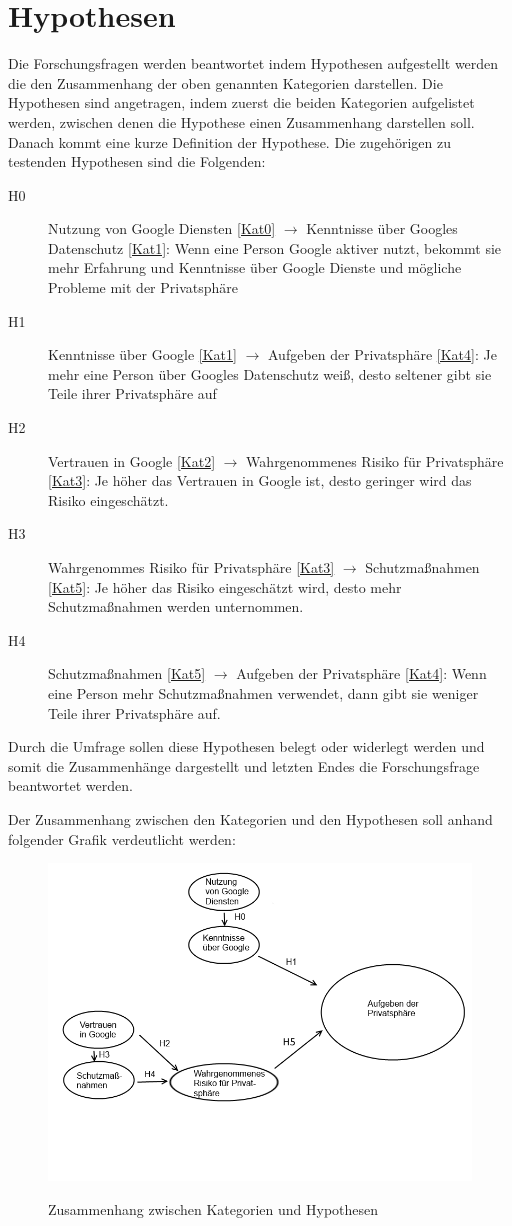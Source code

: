 \section{Hypothesen}
Die Forschungsfragen werden beantwortet indem Hypothesen aufgestellt werden die den Zusammenhang der oben genannten Kategorien darstellen.
Die Hypothesen sind angetragen, indem zuerst die beiden Kategorien aufgelistet werden, zwischen denen die Hypothese einen Zusammenhang darstellen soll. Danach kommt eine kurze Definition der Hypothese.
Die zugehörigen zu testenden Hypothesen sind die Folgenden:
\begin{description}
\item[H0] Nutzung von Google Diensten \ref{Kat0} $\rightarrow$ Kenntnisse über Googles Datenschutz \ref{Kat1}: Wenn eine Person Google aktiver nutzt, bekommt sie mehr Erfahrung und Kenntnisse über Google Dienste und mögliche Probleme mit der Privatsphäre
\item[H1] Kenntnisse über Google \ref{Kat1} $\rightarrow$ Aufgeben der Privatsphäre \ref{Kat4}: Je mehr eine Person über Googles Datenschutz weiß, desto seltener gibt sie Teile ihrer Privatsphäre auf
\item[H2] Vertrauen in Google \ref{Kat2} $\rightarrow$ Wahrgenommenes Risiko für Privatsphäre \ref{Kat3}: Je höher das Vertrauen in Google ist, desto geringer wird das Risiko eingeschätzt.
\item[H3] Wahrgenommes Risiko für Privatsphäre \ref{Kat3} $\rightarrow$ Schutzmaßnahmen \ref{Kat5}: Je höher das Risiko eingeschätzt wird, desto mehr Schutzmaßnahmen werden unternommen.
\item[H4] Schutzmaßnahmen \ref{Kat5} $\rightarrow$ Aufgeben der Privatsphäre \ref{Kat4}: Wenn eine Person mehr Schutzmaßnahmen verwendet, dann gibt sie weniger Teile ihrer Privatsphäre auf.
\end{description}
Durch die Umfrage sollen diese Hypothesen belegt oder widerlegt werden und somit die Zusammenhänge dargestellt und letzten Endes die Forschungsfrage beantwortet werden.

Der Zusammenhang zwischen den Kategorien und den Hypothesen soll anhand folgender Grafik verdeutlicht werden:
\begin{figure}[H]
\centering
\includegraphics[scale=0.55]{images/bubbles}\\
\caption{Zusammenhang zwischen Kategorien und Hypothesen}\label{bubbles}
\end{figure}